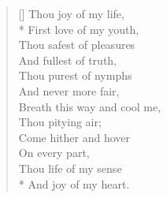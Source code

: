 \documentclass[MAIN]{subfiles}
\begin{document}
\settowidth{\versewidth}{Breath this way and cool me,}
\begin{verse}[\versewidth]
Thou joy of my life,\\* 
First love of my youth,\\
Thou safest of pleasures\\
And fullest of truth,\\
Thou purest of nymphs\\
And never more fair,\\
Breath this way and cool me,\\
Thou pitying air;\\
Come hither and hover\\
On every part,\\
Thou life of my sense\\*
And joy of my heart.
\end{verse}
\end{document}
